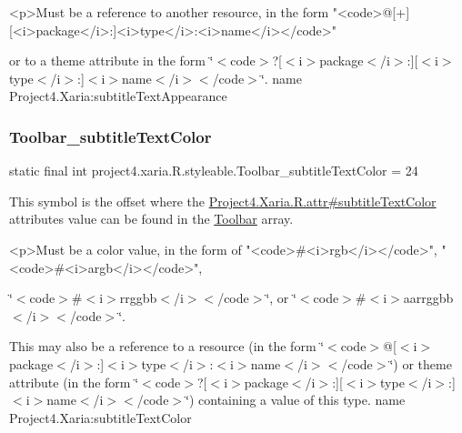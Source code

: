 \begin{DoxyVerb}      <p>Must be a reference to another resource, in the form "<code>@[+][<i>package</i>:]<i>type</i>:<i>name</i></code>"
\end{DoxyVerb}
 or to a theme attribute in the form \char`\"{}$<$code$>$?\mbox{[}$<$i$>$package$<$/i$>$\+:\mbox{]}\mbox{[}$<$i$>$type$<$/i$>$\+:\mbox{]}$<$i$>$name$<$/i$>$$<$/code$>$\char`\"{}.  name Project4.\+Xaria\+:subtitle\+Text\+Appearance \mbox{\label{classproject4_1_1xaria_1_1R_1_1styleable_af2caead52c870ae8c1443c261585491e}} 
\subsubsection{\texorpdfstring{Toolbar\+\_\+subtitle\+Text\+Color}{Toolbar\_subtitleTextColor}}
{\footnotesize\ttfamily static final int project4.\+xaria.\+R.\+styleable.\+Toolbar\+\_\+subtitle\+Text\+Color = 24\hspace{0.3cm}{\ttfamily [static]}}

This symbol is the offset where the \hyperlink{}{Project4.\+Xaria.\+R.\+attr\#subtitle\+Text\+Color} attribute\textquotesingle{}s value can be found in the \hyperlink{classproject4_1_1xaria_1_1R_1_1styleable_af6c30f9e9e086f6bf4e510669443fa59}{Toolbar} array.

\begin{DoxyVerb}      <p>Must be a color value, in the form of "<code>#<i>rgb</i></code>", "<code>#<i>argb</i></code>",
\end{DoxyVerb}
 \char`\"{}$<$code$>$\#$<$i$>$rrggbb$<$/i$>$$<$/code$>$\char`\"{}, or \char`\"{}$<$code$>$\#$<$i$>$aarrggbb$<$/i$>$$<$/code$>$\char`\"{}. 

This may also be a reference to a resource (in the form \char`\"{}$<$code$>$@\mbox{[}$<$i$>$package$<$/i$>$\+:\mbox{]}$<$i$>$type$<$/i$>$\+:$<$i$>$name$<$/i$>$$<$/code$>$\char`\"{}) or theme attribute (in the form \char`\"{}$<$code$>$?\mbox{[}$<$i$>$package$<$/i$>$\+:\mbox{]}\mbox{[}$<$i$>$type$<$/i$>$\+:\mbox{]}$<$i$>$name$<$/i$>$$<$/code$>$\char`\"{}) containing a value of this type.  name Project4.\+Xaria\+:subtitle\+Text\+Color \mbox{\label{classproject4_1_1xaria_1_1R_1_1styleable_abef8adccf5d6ad9f215787dab4631fcd}} 
